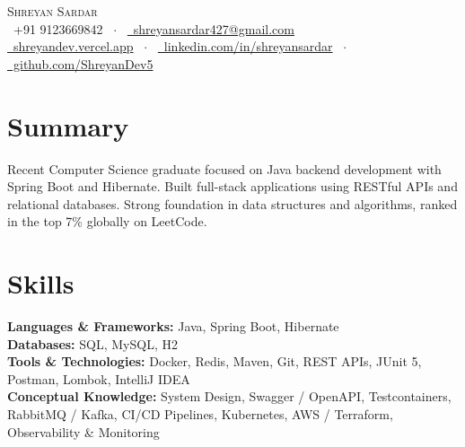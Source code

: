 \documentclass[letterpaper,11pt]{article}
\begin{document}
\begin{center}
    {\Huge \scshape Shreyan Sardar} \\ \vspace{10pt}
    \small \faPhone\ +91 9123669842 ~$\cdot$~ \href{mailto:shreyansardar427@gmail.com}{\faEnvelope\ shreyansardar427@gmail.com} \\ \vspace{4pt}
    \href{https://shreyandev.vercel.app/}{\faLaptop\ shreyandev.vercel.app} ~$\cdot$~
    \href{https://www.linkedin.com/in/shreyansardar/}{\faLinkedin\ linkedin.com/in/shreyansardar} ~$\cdot$~
    \href{https://github.com/ShreyanDev5}{\faGithub\ github.com/ShreyanDev5}
\end{center}

\section{Summary}
Recent Computer Science graduate focused on Java backend development with Spring Boot and Hibernate. Built full-stack applications using RESTful APIs and relational databases. Strong foundation in data structures and algorithms, ranked in the top 7\% globally on LeetCode.

\section{Skills}
\textbf{Languages \& Frameworks:} Java, Spring Boot, Hibernate \\
\textbf{Databases:} SQL, MySQL, H2 \\
\textbf{Tools \& Technologies:} Docker, Redis, Maven, Git, REST APIs, JUnit 5, Postman, Lombok, IntelliJ IDEA \\
\textbf{Conceptual Knowledge:} System Design, Swagger / OpenAPI, Testcontainers, RabbitMQ / Kafka, CI/CD Pipelines, Kubernetes, AWS / Terraform, Observability \& Monitoring

\end{document}
